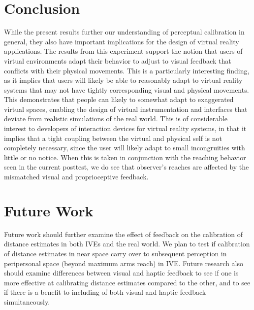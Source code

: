 \section{Conclusion}
While the present results further our understanding of perceptual calibration in general, they also have important implications for the design of virtual reality applications. The results from this experiment support the notion that users of virtual environments adapt their behavior to adjust to visual feedback that conflicts with their physical movements. This is a particularly interesting finding, as it implies that users will likely be able to reasonably adapt to virtual reality systems that may not have tightly corresponding visual and physical movements. This demonstrates that people can likely to somewhat adapt to exaggerated virtual spaces, enabling the design of virtual instrumentation and interfaces that deviate from realistic simulations of the real world. This is of considerable interest to developers of interaction devices for virtual reality systems, in that it implies that a tight coupling between the virtual and physical self is not completely necessary, since the user will likely adapt to small incongruities with little or no notice. When this is taken in conjunction with the reaching behavior seen in the current posttest, we do see that observer's reaches are affected by the mismatched visual and proprioceptive feedback.



\section{Future Work}

Future work should further examine the effect of feedback on the calibration of distance estimates in both IVEs and the real world. We plan to test if calibration of distance estimates in near space carry over to subsequent perception in peripersonal space (beyond maximum arms reach) in IVE. Future research also should examine differences between visual and haptic feedback to see if one is more effective at calibrating distance estimates compared to the other, and to see if there is a benefit to including of both visual and haptic feedback simultaneously.

